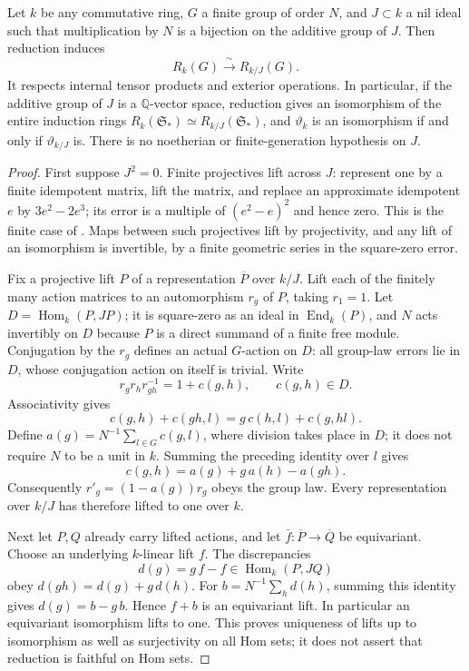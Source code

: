\begin{proposition}
\label{C:divisible_nil_invariance}
Let $k$ be any commutative ring, $G$ a finite group of order $N$,
and $J\subset k$ a nil ideal such that multiplication by $N$ is a
bijection on the additive group of $J$. Then reduction induces
\[
 R_k(G)\xrightarrow{\ \sim\ }R_{k/J}(G).                \tag{C.1.17}
\]
It respects internal tensor products and exterior operations.
In particular, if the additive group of $J$ is a $\mathbb Q$-vector
space, reduction gives an isomorphism of the entire induction rings
$R_k(\mathfrak S_*)\simeq R_{k/J}(\mathfrak S_*)$, and
$\vartheta_k$ is an isomorphism if and only if $\vartheta_{k/J}$ is.
There is no noetherian or finite-generation hypothesis on $J$.
\end{proposition}
\begin{proof}
First suppose $J^2=0$. Finite projectives lift across $J$: represent
one by a finite idempotent matrix, lift the matrix, and replace an
approximate idempotent $e$ by $3e^2-2e^3$; its error is a multiple
of $(e^2-e)^2$ and hence zero. This is the finite case of
\cite[Tags 07LV and 0AMF, Lemma 10.32.7]{C-StacksNil}.
Maps between such projectives lift by projectivity, and any lift
of an isomorphism is invertible, by a finite geometric series in
the square-zero error.

Fix a projective lift $P$ of a representation $\overline P$ over
$k/J$. Lift each of the finitely many action matrices to an
automorphism $r_g$ of $P$, taking $r_1=1$. Let
$D=\operatorname{Hom}_k(P,JP)$; it is square-zero as an ideal in
$\operatorname{End}_k(P)$, and $N$ acts invertibly on $D$ because
$P$ is a direct summand of a finite free module. Conjugation by
the $r_g$ defines an actual $G$-action on $D$: all group-law
errors lie in $D$, whose conjugation action on itself is trivial.
Write
\[
 r_gr_hr_{gh}^{-1}=1+c(g,h),\qquad c(g,h)\in D.
\]
Associativity gives
\[
 c(g,h)+c(gh,l)=g\,c(h,l)+c(g,hl).
\]
Define $a(g)=N^{-1}\sum_{l\in G}c(g,l)$, where division takes
place in $D$; it does not require $N$ to be a unit in $k$.
Summing the preceding identity over $l$ gives
\[
 c(g,h)=a(g)+g\,a(h)-a(gh).
\]
Consequently $r'_g=(1-a(g))r_g$ obeys the group law. Every
representation over $k/J$ has therefore lifted to one over $k$.

Next let $P,Q$ already carry lifted actions, and let
$\bar f:\overline P\to\overline Q$ be equivariant. Choose an
underlying $k$-linear lift $f$. The discrepancies
\[
 d(g)=g\,f-f\in\operatorname{Hom}_k(P,JQ)
\]
obey $d(gh)=d(g)+g\,d(h)$. For
$b=N^{-1}\sum_h d(h)$, summing this identity gives
$d(g)=b-g\,b$. Hence $f+b$ is an equivariant lift. In particular
an equivariant isomorphism lifts to one. This proves uniqueness
of lifts up to isomorphism as well as surjectivity on all Hom sets;
it does not assert that reduction is faithful on Hom sets.


\end{proof}
